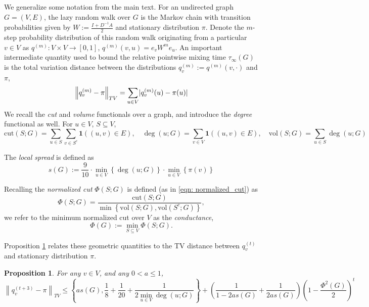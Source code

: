 \documentclass{article}
\DeclarePairedDelimiter\abs{\lvert}{\rvert}
\newcommand{\set}[1]{\left\{#1\right\}}
\newcommand{\vol}{\mathrm{vol}}
\newcommand{\cut}{\mathrm{cut}}
\newcommand{\norm}[1]{\left\lVert#1\right\rVert}
\newcommand{\1}{\mathbf{1}}
\newcommand{\Abf}{A}
\newcommand{\Wbf}{W}
\newcommand{\Dbf}{D}
\newcommand{\Ibf}[1]{I_{#1}}
\theoremstyle{aldenthm}
\newtheorem{proposition}{Proposition}
\theoremstyle{aldenrmrk}
\begin{document}
We generalize some notation from the main text. For an undirected graph $G = (V,E)$, the lazy random walk over $G$ is the Markov chain with transition probabilities given by $\Wbf := \frac{\Ibf{} + \Dbf^{-1} \Abf}{2}$ and stationary distribution $\pi$.  Denote the $m$-step probability distribution of this random walk originating from a particular $v \in V$ as $q^{(m)}: V \times V \to [0,1]$, $q^{(m)}(v,u) = e_v \Wbf^m e_u$. An important intermediate quantity used to bound the relative pointwise mixing time $\tau_{\infty}(G)$ is the total variation distance between the distributions $q_v^{(m)} := q^{(m)}(v,\cdot)$ and $\pi$,
\begin{equation*}
\norm{q_v^{(m)} - \pi}_{TV} = \sum_{u \in V} \abs{q_v^{(m)}(u) - \pi(u)}
\end{equation*}
We recall the \emph{cut} and \emph{volume} functionals over a graph, and introduce the \emph{degree} functional as well. For $u \in V$, $S \subseteq V$, 
\begin{equation*}
\cut(S;G) = \sum_{u \in S} \sum_{v \in S^c} \1((u,v) \in E), \quad \deg(u;G) = \sum_{v \in V} \1((u,v) \in E), \quad \vol(S;G) = \sum_{u \in S} \deg(u;G)
\end{equation*}

The \emph{local spread} is defined as
\begin{equation*}
s(G) := \frac{9}{10} \cdot \min_{u \in V} \set{\deg(u; G)} \cdot \min_{u \in V} \set{\pi(v)}
\end{equation*}

Recalling the \emph{normalized cut} $\Phi(S;G)$ is defined (as in \eqref{eqn: normalized_cut}) as
\begin{equation*}
\Phi(S;G) = \frac{\cut(S; G)}{\min\set{\vol(S; G),\vol(S^c; G)}},
\end{equation*}
we refer to the minimum normalized cut over $V$ as the \emph{conductance},
\begin{equation*}
\Phi(G) := \min_{S \subseteq V} \Phi(S;G).
\end{equation*}

Proposition \ref{prop: tv_mixing_time} relates these geometric quantities to the TV distance between $q_v^{(t)}$ and stationary distribution $\pi$.
\begin{proposition}
	\label{prop: tv_mixing_time}
	For any $v \in V$, and any $0 < a \leq 1$,
	\begin{equation*}
	\norm{q_v^{(t + 3)} - \pi}_{TV} \leq \set{as(G), \frac{1}{8} + \frac{1}{20} + \frac{1}{2 \min_{u \in V} \deg(u;G)}} + \left(\frac{1}{1 - 2as(G)} + \frac{1}{2 as(G)}\right) \left(1 - \frac{\Phi^2(G)}{2}\right)^t
	\end{equation*}
\end{proposition}
\end{document}
